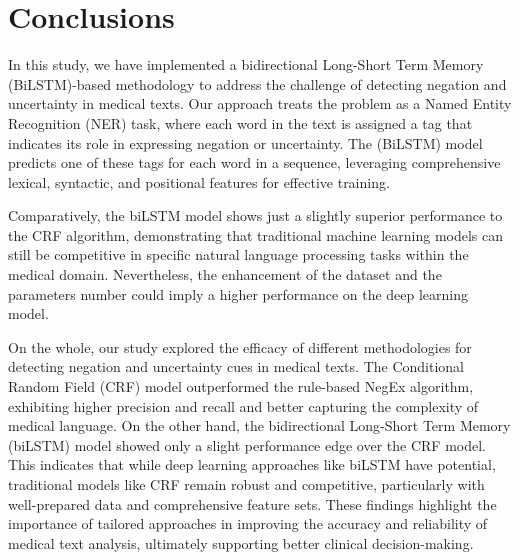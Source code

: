 \documentclass{article}
\begin{document}
\section*{Conclusions}
In this study, we have implemented a bidirectional Long-Short Term Memory (BiLSTM)-based methodology to address the challenge
of detecting negation and uncertainty in medical texts. Our approach treats the problem as a Named Entity Recognition (NER)
task, where each word in the text is assigned a tag that indicates its role in expressing negation or uncertainty. The (BiLSTM)
model predicts one of these tags for each word in a sequence, leveraging comprehensive lexical, syntactic, and positional
features for effective training.

Comparatively, the biLSTM model shows just a slightly superior performance to the CRF algorithm, demonstrating that
traditional machine learning models can still be competitive in specific natural language processing tasks within the
medical domain. Nevertheless, the enhancement of the dataset and the parameters number could imply a higher performance
on the deep learning model. 

On the whole, our study explored the efficacy of different methodologies for detecting negation and uncertainty cues in
medical texts. The Conditional Random Field (CRF) model outperformed the rule-based NegEx algorithm, exhibiting higher
precision and recall and better capturing the complexity of medical language. On the other hand, the bidirectional Long-Short
Term Memory (biLSTM) model showed only a slight performance edge over the CRF model. This indicates that while deep learning
approaches like biLSTM have potential, traditional models like CRF remain robust and competitive, particularly with
well-prepared data and comprehensive feature sets. These findings highlight the importance of tailored approaches in
improving the accuracy and reliability of medical text analysis, ultimately supporting better clinical decision-making.


\printbibliography
\end{document}
